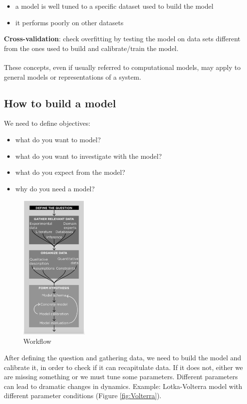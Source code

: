 \begin{itemize}
\tightlist
\item
  a model is well tuned to a specific dataset used to build the model
\item
  it performs poorly on other datasets
\end{itemize}
\noindent
\textbf{Cross-validation}: check overfitting by testing the model on
data sets different from the ones used to build and calibrate/train the
model.
\\
\\
\noindent
These concepts, even if usually referred to computational models, may
apply to general models or representations of a system.


\subsection{How to build a model}

We need to define objectives:

\begin{itemize}
\tightlist
\item
  what do you want to model?
\item
  what do you want to investigate with the model?
\item
  what do you expect from the model?
\item
  why do you need a model?
\end{itemize}

\begin{figure}
\centering
\includegraphics[width=0.3\textwidth]{workflow.png}
\caption{Workflow}
\end{figure}

\noindent
After defining the question and gathering data, we need to build the
model and calibrate it, in order to check if it can recapitulate data.
If it does not, either we are missing something or we must tune some
parameters. Different parameters can lead to dramatic changes in
dynamics. Example: Lotka-Volterra model with different parameter
conditions (Figure \ref{fig:Volterra}).


